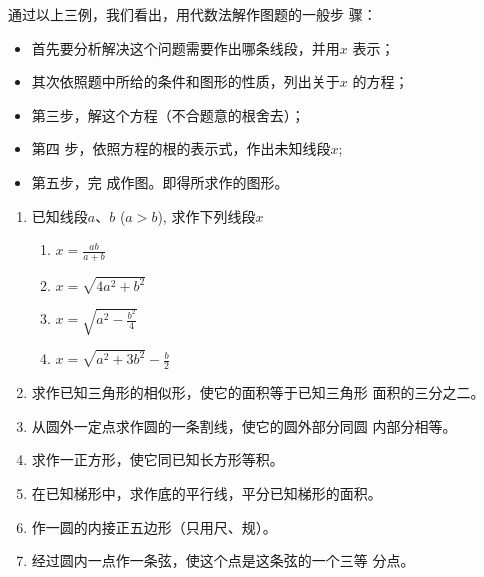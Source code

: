 \begin{figure}[htp]
    \centering
{}
    \caption{}
\end{figure}


通过以上三例，我们看出，用代数法解作图题的一般步
骤：
\begin{itemize}
    \item 首先要分析解决这个问题需要作出哪条线段，并用$x$
表示；
\item 其次依照题中所给的条件和图形的性质，列出关于$x$
的方程；
\item 第三步，解这个方程（不合题意的根舍去）；
\item 第四
步，依照方程的根的表示式，作出未知线段$x$; 
\item 第五步，完
成作图。即得所求作的图形。
\end{itemize}



\begin{ex}
\begin{enumerate}
    \item 已知线段$a$、$b$ ($a>b$), 求作下列线段$x$
\begin{multicols}{2}
    \begin{enumerate}
        \item $x=\frac{ab}{a+b}$
        \item $x=\sqrt{4a^2+b^2}$
        \item $x=\sqrt{a^2-\frac{b^2}{4}}$
        \item $x=\sqrt{a^2+3b^2}-\frac{b}{2}$
    \end{enumerate}
\end{multicols}
    \item 求作已知三角形的相似形，使它的面积等于已知三角形
    面积的三分之二。
    \item 从圆外一定点求作圆的一条割线，使它的圆外部分同圆
    内部分相等。
    \item 求作一正方形，使它同已知长方形等积。
    \item 在已知梯形中，求作底的平行线，平分已知梯形的面积。
    \item 作一圆的内接正五边形（只用尺、规）。
    \item 经过圆内一点作一条弦，使这个点是这条弦的一个三等
分点。
\end{enumerate}
\end{ex}


